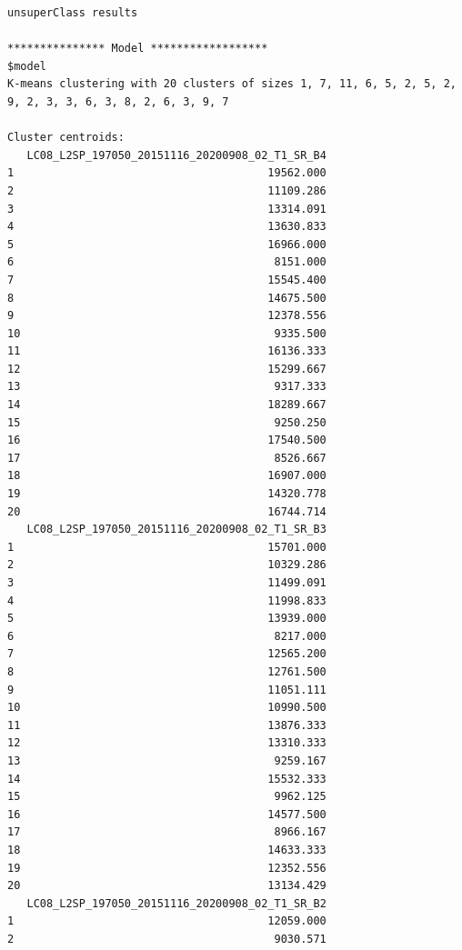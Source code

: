\documentclass[remotesensing,article,submit,pdftex,moreauthors]{Definitions/mdpi}
\begin{document}
\begin{scriptsize}
\begin{verbatim}
unsuperClass results

*************** Model ******************
$model
K-means clustering with 20 clusters of sizes 1, 7, 11, 6, 5, 2, 5, 2, 9, 2, 3, 3, 6, 3, 8, 2, 6, 3, 9, 7

Cluster centroids:
   LC08_L2SP_197050_20151116_20200908_02_T1_SR_B4
1                                       19562.000
2                                       11109.286
3                                       13314.091
4                                       13630.833
5                                       16966.000
6                                        8151.000
7                                       15545.400
8                                       14675.500
9                                       12378.556
10                                       9335.500
11                                      16136.333
12                                      15299.667
13                                       9317.333
14                                      18289.667
15                                       9250.250
16                                      17540.500
17                                       8526.667
18                                      16907.000
19                                      14320.778
20                                      16744.714
   LC08_L2SP_197050_20151116_20200908_02_T1_SR_B3
1                                       15701.000
2                                       10329.286
3                                       11499.091
4                                       11998.833
5                                       13939.000
6                                        8217.000
7                                       12565.200
8                                       12761.500
9                                       11051.111
10                                      10990.500
11                                      13876.333
12                                      13310.333
13                                       9259.167
14                                      15532.333
15                                       9962.125
16                                      14577.500
17                                       8966.167
18                                      14633.333
19                                      12352.556
20                                      13134.429
   LC08_L2SP_197050_20151116_20200908_02_T1_SR_B2
1                                       12059.000
2                                        9030.571

\end{verbatim}
\end{scriptsize}
\end{document}
